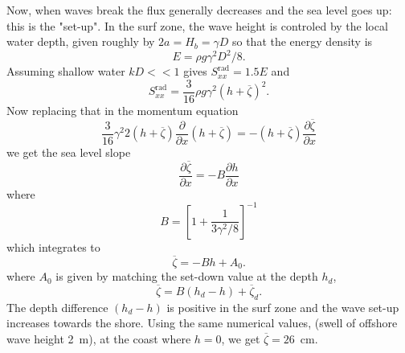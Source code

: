 Now, when waves break the flux generally decreases and the sea level goes up: this is the "set-up". In the surf zone, the wave height is controled by the local water depth, given roughly by $2a=H_b=\gamma D$ so that the energy density  is 
\begin{equation}
    E=\rho g \gamma^2 D^2/8.
\end{equation}
Assuming shallow water  $kD <<
1$ gives $S^{\mathrm{rad}}_{xx} =  1.5 E$ and 
\begin{equation}
    S^{\mathrm{rad}}_{xx}=\frac{3}{16}\rho g \gamma^2 \left(h+\overline{\zeta}\right)^2.
\end{equation}
Now replacing that in the momentum equation
\begin{equation}
    \frac{3}{16} \gamma^2 2\left(h+\overline{\zeta}\right)
    \frac{\partial}{\partial x} \left(h+\overline{\zeta}\right)
    =- \left(h+\overline{\zeta}\right)\frac{\partial \overline{\zeta}}{\partial x}
\end{equation}
we get the sea level slope
\begin{equation}
    \frac{\partial \overline{\zeta}}{\partial x}
    =- B \frac{\partial h}{\partial x}
\end{equation}
where
\begin{equation}
    B=\left[1+\frac{1}{3 \gamma^2/8}\right]^{-1}
\end{equation}
which integrates to 
\begin{equation}
    \overline{\zeta}
    =-B h + A_0.
\end{equation}
where $A_0$ is given by matching the set-down value at the depth $h_d$, 
\begin{equation}
    \overline{\zeta}
    =B \left(h_d-h\right) + \overline{\zeta}_d.
\end{equation}
The depth difference $\left(h_d-h\right)$ is positive in the surf zone and the wave set-up increases towards the shore. Using the same numerical values, 
(swell of offshore wave height 2~m), at the coast where $h=0$, we get  $\overline{\zeta}=26$~cm.

